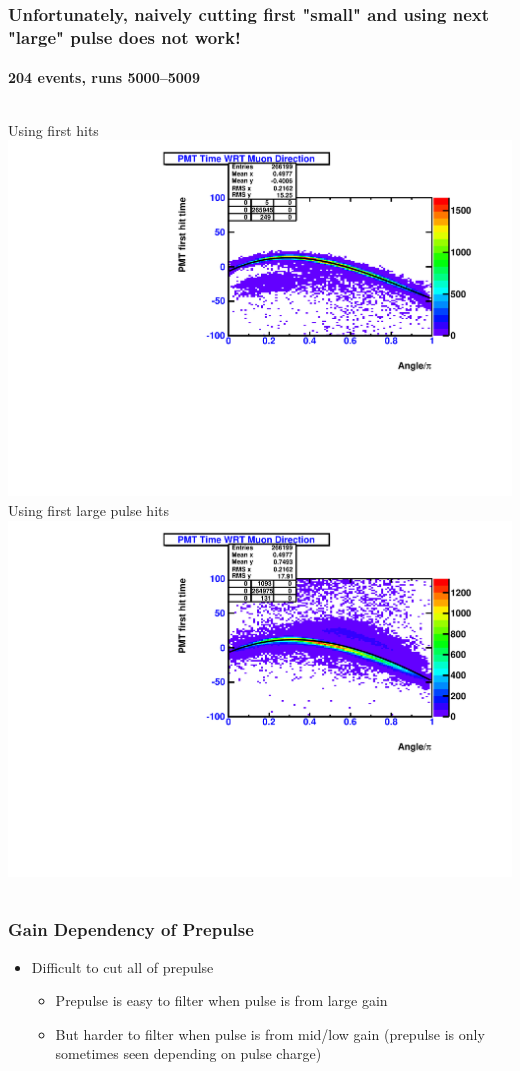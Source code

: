 \documentclass{beamer}
\begin{document}
\begin{frame}
	\frametitle{Unfortunately, naively cutting first "small" and using next "large" pulse does not work!}
	\framesubtitle{204 events, runs \numrange[range-phrase=--]{5000}{5009}}
	\begin{columns}[t]
		Using first hits
		\includegraphics[width=1.0\textwidth]{analyzed_rtq_atm_mu_run005000_test_hitTimePositions_includeEarlyLateHits.pdf}
		Using first large pulse hits
		\includegraphics[width=1.0\textwidth]{analyzed_rtq_atm_mu_run005000_multiPulse_test_hitTimePositions_includeEarlyLateHits.pdf}
	\end{columns}
\end{frame}

\begin{frame}
	\frametitle{Gain Dependency of Prepulse}
	\begin{itemize}
		\item Difficult to cut all of prepulse
			\begin{itemize}
				\item Prepulse is easy to filter when pulse is from large gain
				\item But harder to filter when pulse is from mid/low gain
					(prepulse is only sometimes seen depending on pulse charge)
			\end{itemize}
	\end{itemize}
\end{frame}
\end{document}

